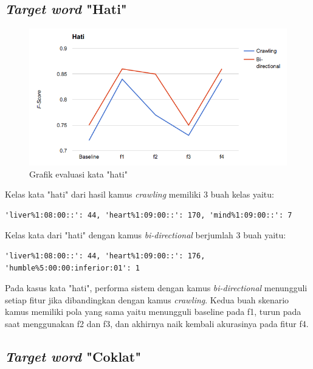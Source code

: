 \subsection{\textit{Target word} "Hati"}

\begin{figure}
	\centering
	\includegraphics[width=1\linewidth]{adit_pics/hati.png}
	\caption{Grafik evaluasi kata "hati"}
	\label{fig:hati}
\end{figure}

Kelas kata "hati" dari hasil kamus \textit{crawling} memiliki 3 buah kelas yaitu:
\begin{lstlisting}
'liver%1:08:00::': 44, 'heart%1:09:00::': 170, 'mind%1:09:00::': 7
\end{lstlisting}
Kelas kata dari "hati" dengan kamus \textit{bi-directional} berjumlah 3 buah yaitu:
\begin{lstlisting}
'liver%1:08:00::': 44, 'heart%1:09:00::': 176, 'humble%5:00:00:inferior:01': 1
\end{lstlisting}

Pada kasus kata "hati", performa sistem dengan kamus \textit{bi-directional} menungguli setiap fitur jika dibandingkan dengan kamus \textit{crawling}. Kedua buah skenario kamus memiliki pola yang sama yaitu menungguli baseline pada f1, turun pada saat menggunakan f2 dan f3, dan akhirnya naik kembali akurasinya pada fitur f4. 

\subsection{\textit{Target word} "Coklat"}

